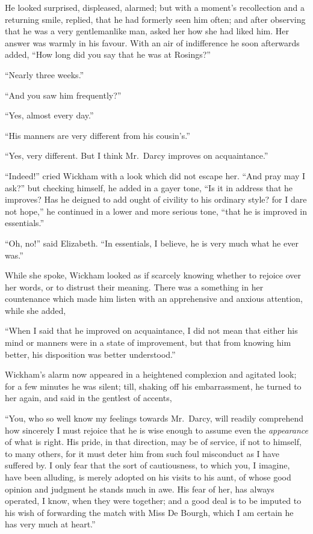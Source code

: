 He looked surprised, displeased, alarmed; but with
a moment’s recollection and a returning smile, replied,
that he had formerly seen him often; and after observing
that he was a very gentlemanlike man, asked her how she
had liked him. Her answer was warmly in his favour.
With an air of indifference he soon afterwards added,
“How long did you say that he was at Rosings?”

“Nearly three weeks.”

“And you saw him frequently?”

“Yes, almost every day.”

“His manners are very different from his cou\-sin’s.”

“Yes, very different. But I think Mr.\ Darcy improves
on acquaintance.”

“Indeed!” cried Wickham with a look which did not
escape her. “And pray may I ask?” but checking himself,
he added in a gayer tone, “Is it in address that he
improves? Has he deigned to add ought of civility to
his ordinary style? for I dare not hope,” he continued
in a lower and more serious tone, “that he is improved
in essentials.”

“Oh, no!” said Elizabeth. “In essentials, I believe,
he is very much what he ever was.”

While she spoke, Wickham looked as if scarcely knowing
whether to rejoice over her words, or to distrust their
meaning. There was a something in her countenance
which made him listen with an apprehensive and anxious
attention, while she added,

“When I said that he improved on acquaintance, I did
not mean that either his mind or manners were in a state
of improvement, but that from knowing him better, his
disposition was better understood.”

Wickham’s alarm now appeared in a heightened complexion
and agitated look; for a few minutes he was
silent; till, shaking off his embarrassment, he turned to
her again, and said in the gentlest of accents,

“You, who so well know my feelings towards Mr.\ Darcy,
will readily comprehend how sincerely I must rejoice that
he is wise enough to assume even the \textit{appearance} of what
is right. His pride, in that direction, may be of service,
if not to himself, to many others, for it must deter him
from such foul misconduct as I have suffered by. I only
fear that the sort of cautiousness, to which you, I imagine,
have been alluding, is merely adopted on his visits to his
aunt, of whose good opinion and judgment he stands
much in awe. His fear of her, has always operated,
I know, when they were together; and a good deal is to
be imputed to his wish of forwarding the match with
Miss De Bourgh, which I am certain he has very much
at heart.”

